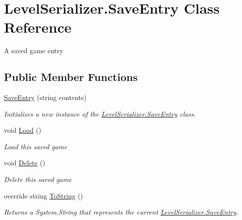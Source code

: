 \hypertarget{class_level_serializer_1_1_save_entry}{}\section{Level\+Serializer.\+Save\+Entry Class Reference}
\label{class_level_serializer_1_1_save_entry}


A saved game entry  


\subsection*{Public Member Functions}
\begin{DoxyCompactItemize}
\item 
\hyperlink{class_level_serializer_1_1_save_entry_a60b88cee5e6967c3b5b026ad78b4bc88}{Save\+Entry} (string contents)
\begin{DoxyCompactList}\small\item\em Initializes a new instance of the \hyperlink{class_level_serializer_1_1_save_entry}{Level\+Serializer.\+Save\+Entry} class. \end{DoxyCompactList}\item 
void \hyperlink{class_level_serializer_1_1_save_entry_aebbbfd37345c0a1b60b9765f483b459a}{Load} ()
\begin{DoxyCompactList}\small\item\em Load this saved game \end{DoxyCompactList}\item 
void \hyperlink{class_level_serializer_1_1_save_entry_a2765a55d5ea9a53a7f2abc9e0d4ea3c9}{Delete} ()
\begin{DoxyCompactList}\small\item\em Delete this saved game \end{DoxyCompactList}\item 
override string \hyperlink{class_level_serializer_1_1_save_entry_a643faa4c478ba8fed108000aa3493157}{To\+String} ()
\begin{DoxyCompactList}\small\item\em Returns a System.\+String that represents the current \hyperlink{class_level_serializer_1_1_save_entry}{Level\+Serializer.\+Save\+Entry}. \end{DoxyCompactList}\end{DoxyCompactItemize}

